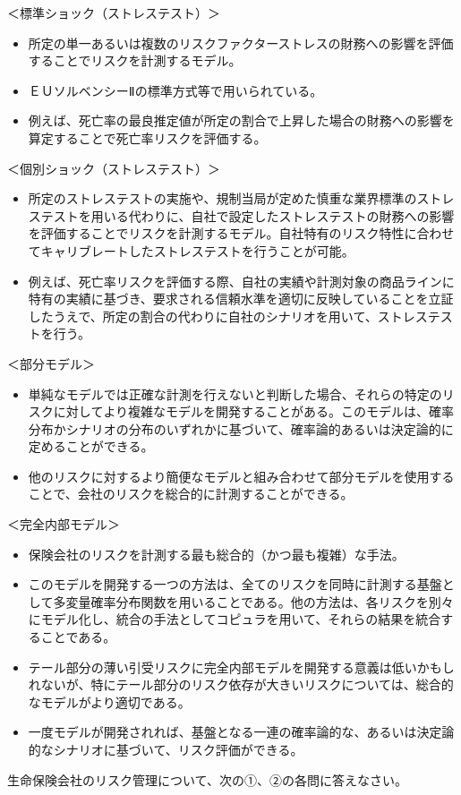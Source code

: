 \documentclass[report,gutter=10mm,fore-edge=10mm,uplatex,dvipdfmx]{jlreq}
\begin{document}
＜標準ショック（ストレステスト）＞

\begin{itemize}
\item[] 所定の単一あるいは複数のリスクファクターストレスの財務への影響を評価することでリスクを計測するモデル。
\item[] ＥＵソルベンシーⅡの標準方式等で用いられている。
\item[] 例えば、死亡率の最良推定値が所定の割合で上昇した場合の財務への影響を算定することで死亡率リスクを評価する。
\end{itemize}

＜個別ショック（ストレステスト）＞

\begin{itemize}
\item[] 所定のストレステストの実施や、規制当局が定めた慎重な業界標準のストレステストを用いる代わりに、自社で設定したストレステストの財務への影響を評価することでリスクを計測するモデル。自社特有のリスク特性に合わせてキャリブレートしたストレステストを行うことが可能。
\item[] 例えば、死亡率リスクを評価する際、自社の実績や計測対象の商品ラインに特有の実績に基づき、要求される信頼水準を適切に反映していることを立証したうえで、所定の割合の代わりに自社のシナリオを用いて、ストレステストを行う。
\end{itemize}

＜部分モデル＞

\begin{itemize}
\item[] 単純なモデルでは正確な計測を行えないと判断した場合、それらの特定のリスクに対してより複雑なモデルを開発することがある。このモデルは、確率分布かシナリオの分布のいずれかに基づいて、確率論的あるいは決定論的に定めることができる。
\item[] 他のリスクに対するより簡便なモデルと組み合わせて部分モデルを使用することで、会社のリスクを総合的に計測することができる。
\end{itemize}

＜完全内部モデル＞

\begin{itemize}
\item[] 保険会社のリスクを計測する最も総合的（かつ最も複雑）な手法。
\item[] このモデルを開発する一つの方法は、全てのリスクを同時に計測する基盤として多変量確率分布関数を用いることである。他の方法は、各リスクを別々にモデル化し、統合の手法としてコピュラを用いて、それらの結果を統合することである。
\item[] テール部分の薄い引受リスクに完全内部モデルを開発する意義は低いかもしれないが、特にテール部分のリスク依存が大きいリスクについては、総合的なモデルがより適切である。
\item[] 一度モデルが開発されれば、基盤となる一連の確率論的な、あるいは決定論的なシナリオに基づいて、リスク評価ができる。
\end{itemize}
生命保険会社のリスク管理について、次の①、②の各問に答えなさい。
\end{document}
